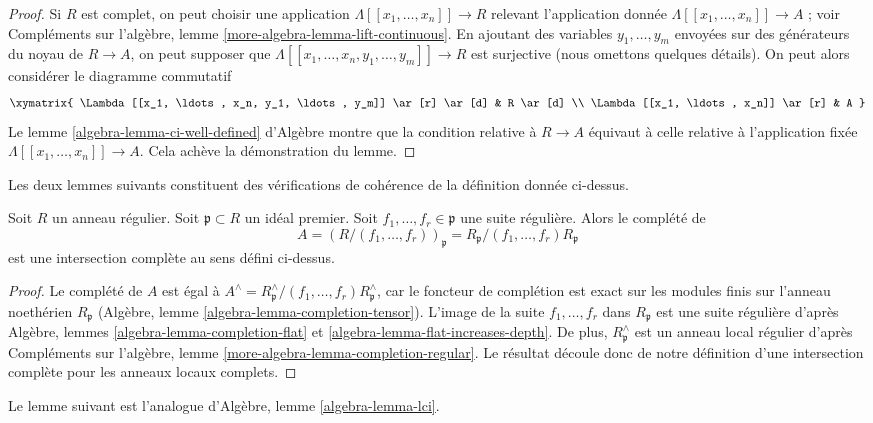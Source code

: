 \begin{proof}
\medskip\noindent
Si $R$ est complet, on peut choisir une application
$\Lambda[[x_1, \ldots, x_n]] \to R$ relevant l'application donnée
$\Lambda[[x_1, \ldots, x_n]] \to A$ ; voir
Compléments sur l'algèbre, lemme \ref{more-algebra-lemma-lift-continuous}.
En ajoutant des variables $y_1, \ldots, y_m$ envoyées
sur des générateurs du noyau de $R \to A$, on peut supposer que
$\Lambda[[x_1, \ldots, x_n, y_1, \ldots, y_m]] \to R$ est surjective
(nous omettons quelques détails). On peut alors considérer le diagramme
commutatif
$$
\xymatrix{
\Lambda[[x_1, \ldots, x_n, y_1, \ldots, y_m]] \ar[r] \ar[d] & R \ar[d] \\
\Lambda[[x_1, \ldots, x_n]] \ar[r] & A
}
$$
Le lemme \ref{algebra-lemma-ci-well-defined} d'Algèbre montre que
la condition relative à $R \to A$ équivaut à celle relative à
l'application fixée
$\Lambda[[x_1, \ldots, x_n]] \to A$. Cela achève la démonstration du lemme.
\end{proof}

\noindent
Les deux lemmes suivants constituent des vérifications de cohérence
de la définition donnée ci-dessus.

\begin{lemma}
\label{lemma-quotient-regular-ring-by-regular-sequence}
Soit $R$ un anneau régulier. Soit $\mathfrak p \subset R$ un idéal premier.
Soit $f_1, \ldots, f_r \in \mathfrak p$ une suite régulière.
Alors le complété de
$$
A = (R/(f_1, \ldots, f_r))_\mathfrak p =
R_\mathfrak p/(f_1, \ldots, f_r)R_\mathfrak p
$$
est une intersection complète au sens défini ci-dessus.
\end{lemma}

\begin{proof}
Le complété de $A$ est égal à
$A^\wedge = R_\mathfrak p^\wedge/(f_1, \ldots, f_r)R_\mathfrak p^\wedge$,
car le foncteur de complétion est exact sur les modules finis sur l'anneau
noethérien $R_\mathfrak p$
(Algèbre, lemme \ref{algebra-lemma-completion-tensor}).
L'image de la suite $f_1, \ldots, f_r$ dans $R_\mathfrak p$
est une suite régulière d'après
Algèbre, lemmes \ref{algebra-lemma-completion-flat} et
\ref{algebra-lemma-flat-increases-depth}.
De plus, $R_\mathfrak p^\wedge$ est un anneau local régulier d'après
Compléments sur l'algèbre, lemme
\ref{more-algebra-lemma-completion-regular}.
Le résultat découle donc de notre définition d'une intersection
complète pour les anneaux locaux complets.
\end{proof}

\noindent
Le lemme suivant est l'analogue d'Algèbre, lemme
\ref{algebra-lemma-lci}.


